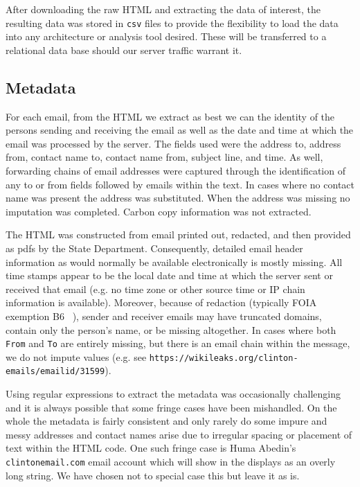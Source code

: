 \documentclass[journal]{vgtc}                %
\begin{document}
After downloading the raw HTML and extracting the data of interest, the resulting data was stored in \texttt{csv} files to provide the flexibility to load the data into any architecture or analysis tool desired.  These will be transferred to a relational data base should our server traffic warrant it.

\subsection{Metadata}
\label{sect:data:metadata}
For each email, from the HTML we extract as best we can the identity of the persons sending and receiving the email as well as the date and time at which the email was processed by the server. The fields used were the address to, address from, contact name to, contact name from, subject line, and time. As well, forwarding chains of email addresses were captured through the identification of any to or from fields followed by emails within the text. In cases where no contact name was present the address was substituted. When the address was missing no imputation was completed. Carbon copy information was not extracted.

The HTML was constructed from email printed out, redacted, and then provided as pdfs by the State Department.  Consequently, detailed email header information as would normally be available electronically is mostly missing.   All time stamps appear to be the local date and time at which the server sent or received that email (e.g. no time zone or other source time or IP chain information is available).  Moreover, because of redaction (typically FOIA exemption B6 ~\cite{FOIA}),  sender and receiver emails may have truncated domains,  contain only the person's name, or be missing altogether.  In cases where both \texttt{From} and \texttt{To} are entirely missing, but there is an email chain within the message, we do not impute values  (e.g. see \texttt{https://wikileaks.org/clinton-emails/emailid/31599}).

Using regular expressions to extract the metadata was occasionally challenging and it is always possible that some fringe cases have been mishandled.  On the whole the metadata is fairly consistent and only rarely do some impure and messy addresses and contact names arise  due to irregular spacing or placement of text within the HTML code.  One such fringe case is Huma Abedin's \texttt{clintonemail.com} email account which will show in the displays as an overly long string.  We have chosen not to special case this but leave it as is.
\end{document}
